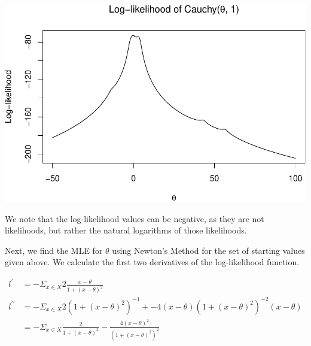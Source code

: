 \documentclass[]{article}
\begin{document}
\includegraphics{Atlas-PS_2_files/figure-latex/unnamed-chunk-6-1.pdf}

We note that the log-likelihood values can be negative, as they are not
likelihoods, but rather the natural logarithms of those likelihoods.

Next, we find the MLE for \(\theta\) using Newton's Method for the set
of starting values given above. We calculate the first two derivatives
of the log-likelihood function.

\begin{align*}
l^{\prime} &= - \Sigma_{x \in X} 2 \frac{x - \theta}{1 + (x - \theta) ^2} \\
l^{\prime \prime} &= 
  - \Sigma_{x \in X} 2(1 + (x - \theta)^2)^{-1} + 
    -4 (x - \theta)(1 + (x - \theta)^2)^{-2}(x - \theta) \\
    &= - \Sigma_{x \in X} \frac{2}{1 + (x - \theta)^2} - 
    \frac{4(x - \theta)^2}{(1 + (x - \theta)^2)^2}
\end{align*}
\end{document}
